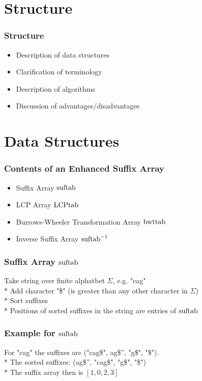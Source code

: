 \documentclass[compress,handout]{beamer} %
\begin{document}
\section{Structure}

\begin{frame}
	\frametitle{Structure}
	\begin{itemize}
		\item Description of data structures
		\item Clarification of terminology
		\item Description of algorithms
		\item Discussion of advantages/disadvantages
	\end{itemize}
\end{frame}

\section{Data Structures}

\begin{frame}
	\frametitle{Contents of an Enhanced Suffix Array}
	\begin{itemize}
		\item Suffix Array $\hbox{suftab}$
		\item LCP Array $\hbox{LCPtab}$
		\item Burrows-Wheeler Transformation Array $\hbox{bwttab}$
		\item Inverse Suffix Array $\hbox{suftab}^{-1}$
	\end{itemize}
\end{frame}

\begin{frame}
	\frametitle{Suffix Array $\hbox{suftab}$}
	Take string over finite alphatbet $\Sigma$, e.g. "cag" \\*
	Add character "\$" (is greater than any other character in $\Sigma$) \\*
	Sort suffixes \\*
	Positions of sorted suffixes in the string are entries of $\hbox{suftab}$
\end{frame}

\begin{frame}
	\frametitle{Example for $\hbox{suftab}$}
	For "cag" the suffixes are ("cag\$", \dq ag\$'', "g\$", "\$"). \\*
	The sorted suffixes: (\dq ag\$'', "cag\$", "g\$", "\$") \\*
	The suffix array then is $[1, 0, 2, 3]$
\end{frame}
\end{document}
